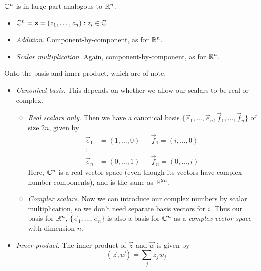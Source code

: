 \documentclass{../template/note}
\begin{document}
    \begin{definition}
        \(\mathbb C^n\) is in large part analogous to \(\mathbb R^n\).
        \begin{itemize}
            \item \(\CC^n = {\vec z = (z_1, \dots, z_n): z_i \in \CC}\)
            \item \emph{Addition}. Component-by-component, as for \(\mathbb R^n\).
            \item \emph{Scalar multiplication}. Again, component-by-component, as for \(\mathbb R^n\).
        \end{itemize}
        Onto the basis and inner product, which are of note.
        \begin{itemize}
            \item \emph{Canonical basis}. This depends on whether we allow our scalars to be real or complex.
            \begin{itemize}
                \item \emph{Real scalars only}. Then we have a canonical basis \(\{\vec e_1, \dots, \vec e_n, \vec f_1, \dots, \vec f_n\}\) of size \(2n\), given by
                \begin{align*}
                    \vec e_1 &= (1, \dots, 0) && \vec f_1 = (i, \dots, 0) \\
                    \vdots \\
                    \vec e_n &= (0, \dots, 1) && \vec f_n = (0, \dots, i)
                \end{align*}
                Here, \(\mathbb C^n\) is a real vector space (even though its vectors have complex number components), and is the same as \(\mathbb R^{2n}\).
                \item \emph{Complex scalars}. Now we can introduce our complex numbers by scalar multiplication, so we don't need separate basis vectors for \(i\). Thus our basis for \(\mathbb R^n\), \(\{\vec e_1, \dots, \vec e_n\}\) is also a basis for \(\mathbb C^n\) as a \emph{complex vector space} with dimension \(n\).
            \end{itemize}
            \item \emph{Inner product}. The inner product of \(\vec z\) and \(\vec w\) is given by
            \[
                (\vec z, \vec w)= \sum_j \overline{z_j} w_j
            \]
        \end{itemize}
            \begin{itemize}[resume]       
        

\end{itemize}
\end{definition}
\end{document}
